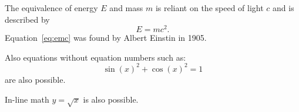 \documentclass{article}
\begin{document}
The equivalence of energy $E$ and mass $m$ is reliant on the speed of
light $c$ and is described by
\begin{equation}
  E=mc^2.
  \label{eq:emc}
\end{equation}
Equation~\ref{eq:emc} was found by Albert Einstin in 1905.

Also equations without equation numbers such as:
\begin{equation*}
  \sin(x)^2 + \cos(x)^2 = 1
\end{equation*}
are also possible.

In-line math $y=\sqrt{x}$ is also possible.
\end{document}

